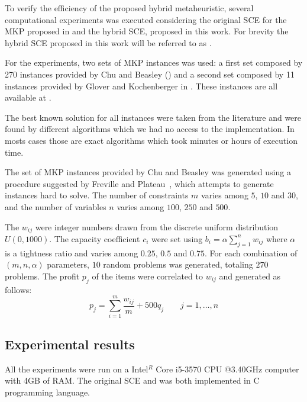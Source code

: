 To verify the efficiency of the proposed hybrid metaheuristic, several computational
experiments was executed considering the original SCE for the MKP proposed in
\cite{baroni2015shuffled} and the hybrid SCE, proposed in this work.
For brevity the hybrid SCE proposed in this work will be referred to as \scecore.

For the experiments, two sets of MKP instances was used:
a first set composed by 270 instances provided by Chu and Beasley (\cite{Chu-Beasley-1998})
and a second set composed by 11 instances provided by Glover and Kochenberger in
\cite{glover1996critical}.
These instances are all available at \cite{ORLibrary}.

The best known solution for all instances were taken from the literature and
were found by different algorithms which we had no access to the implementation.
In mosts cases those are exact algorithms which took
minutes or hours of execution time.

The set of MKP instances provided by Chu and Beasley was generated using a
procedure suggested by Freville and Plateau~\cite{freville1994efficient}, which
attempts to generate instances hard to solve.
The number of constraints $m$ varies among $5$, $10$ and $30$, and the number
of variables $n$ varies among $100$, $250$ and $500$.

The $w_{ij}$ were integer numbers drawn from the discrete uniform distribution
$U(0, 1000)$.
The capacity coefficient $c_i$ were set using
$b_i = \alpha\sum_{j=1}^{n} w_{ij}$ where $\alpha$ is a tightness ratio and
varies among $0.25$, $0.5$ and $0.75$.
For each combination of $(m,n,\alpha)$ parameters, $10$ random problems was generated,
totaling $270$ problems.
The profit $p_j$ of the items were correlated to $w_{ij}$ and generated as follows:
\begin{equation}
  p_j = \sum_{i=1}^m \frac{w_{ij}}{m} + 500q_j \qquad j = 1, \ldots, n
\end{equation}

\subsection{Experimental results}

All the experiments were run on a Intel$^R$ Core i5-3570 CPU @3.40GHz computer
with 4GB of RAM.
The original SCE and \scecore was both implemented in C programming language.


